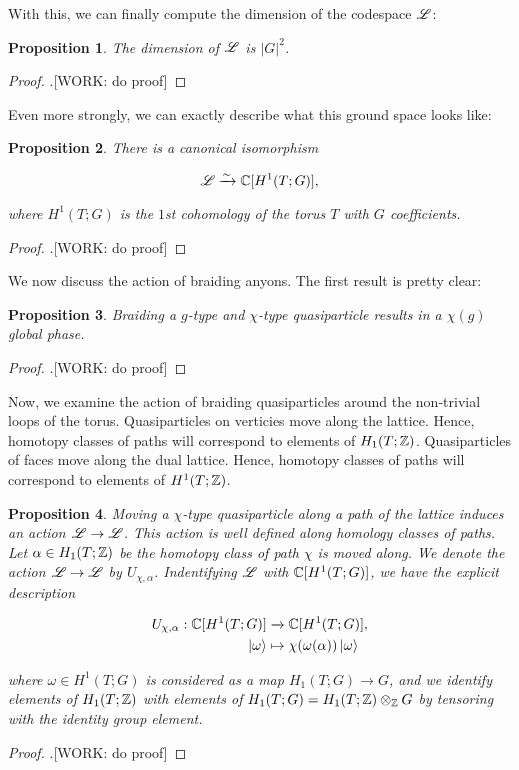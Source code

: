 \documentclass{article}
\newtheorem{proposition}{Proposition}
\theoremstyle{definition}
\numberwithin{figure}{section}
\begin{document}
With this, we can finally compute the dimension of the codespace $\mathscr{L}$:

\begin{proposition} The dimension of $\mathscr{L}$ is $|G|^2$. 
\end{proposition}
\begin{proof}.[WORK: do proof]
\end{proof}

Even more strongly, we can exactly describe what this ground space looks like:

\begin{proposition} There is a canonical isomorphism

$$\mathscr{L}\xrightarrow{\sim}\mathbb{C}[H^1(T;G)],$$

where $H^1(T;G)$ is the $1$st cohomology of the torus $T$ with $G$ coefficients.
\end{proposition}
\begin{proof}.[WORK: do proof]
\end{proof}

We now discuss the action of braiding anyons. The first result is pretty clear:

\begin{proposition} Braiding a $g$-type and $\chi$-type quasiparticle results in a $\chi(g)$ global phase.
\end{proposition}
\begin{proof}.[WORK: do proof]
\end{proof}

Now, we examine the action of braiding quasiparticles around the non-trivial loops of the torus. Quasiparticles on verticies move along the lattice. Hence, homotopy classes of paths will correspond to elements of $H_1(T;\mathbb{Z})$. Quasiparticles of faces move along the dual lattice. Hence, homotopy classes of paths will correspond to elements of $H^1(T;\mathbb{Z})$.

\begin{proposition} Moving a $\chi$-type quasiparticle along a path of the lattice induces an action $\mathscr{L}\to \mathscr{L}$. This action is well defined along homology classes of paths. Let $\alpha\in H_1(T;\mathbb{Z})$ be the homotopy class of path $\chi$ is moved along. We denote the action $\mathscr{L}\to \mathscr{L}$ by $U_{\chi,\alpha}$. Indentifying $\mathscr{L}$ with $\mathbb{C}[H^1(T;G)]$, we have the explicit description

\begin{align*}
U_{\chi,\alpha}:\mathbb{C}[H^1(T;G)]&\xrightarrow{}\mathbb{C}[H^1(T;G)],\\
\left| \omega \right>& \mapsto \chi(\omega(\alpha))\left| \omega \right>
\end{align*}

where $\omega\in H^1(T;G)$ is considered as a map $H_1(T;G)\to G$, and we identify elements of $H_1(T;\mathbb{Z})$ with elements of $H_1(T;G)=H_1(T;\mathbb{Z})\otimes_{\mathbb{Z}} G$ by tensoring with the identity group element.
\end{proposition}
\begin{proof}.[WORK: do proof]
\end{proof}
\end{document}

